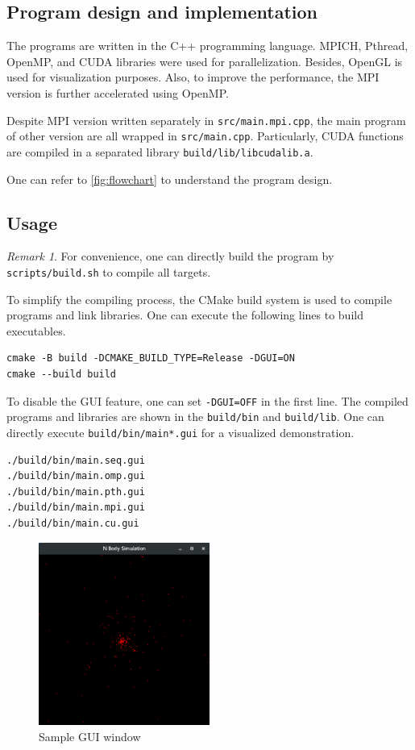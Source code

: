 \documentclass[twoside,12pt]{article}
\theoremstyle{definition}
\theoremstyle{remark}
\newtheorem*{remark}{Remark}
\begin{document}
\subsection{Program design and implementation}
The programs are written in the C++ programming language.
MPICH, Pthread, OpenMP, and CUDA libraries were used for parallelization.
Besides, OpenGL is used for visualization purposes.
Also, to improve the performance, the MPI version is further accelerated
using OpenMP.

Despite MPI version written separately in \lstinline|src/main.mpi.cpp|, 
the main program of other version are all wrapped
in \lstinline|src/main.cpp|.
Particularly, CUDA functions are compiled in a separated library
\lstinline|build/lib/libcudalib.a|.

One can refer to \ref{fig:flowchart} to understand the program design.


\subsection{Usage}
\begin{remark}
For convenience, one can directly build the program by \lstinline|scripts/build.sh|
to compile all targets.
\end{remark}
To simplify the compiling process, the CMake build system is used
to compile programs and link libraries.
One can execute the following lines to build executables.
\begin{lstlisting}[style=sh]
cmake -B build -DCMAKE_BUILD_TYPE=Release -DGUI=ON
cmake --build build
\end{lstlisting}
To disable the GUI feature, one can set \lstinline|-DGUI=OFF| in the first line.
The compiled programs and libraries are shown in the \lstinline|build/bin| and
\lstinline|build/lib|.
One can directly execute \lstinline|build/bin/main*.gui| for a visualized demonstration.
\begin{lstlisting}[style=sh]
./build/bin/main.seq.gui
./build/bin/main.omp.gui
./build/bin/main.pth.gui
./build/bin/main.mpi.gui
./build/bin/main.cu.gui
\end{lstlisting}

\begin{figure}[h!]
    \centering
    \includegraphics[width=0.5\textwidth]{../demo.png}
    \caption{Sample GUI window}
    \label{fig:image}
\end{figure}
\end{document}

